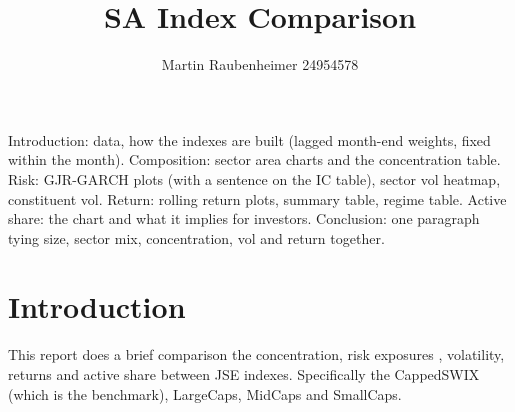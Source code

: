 \documentclass[11pt,preprint]{elsarticle}
\numberwithin{equation}{section}
\numberwithin{figure}{section}
\numberwithin{table}{section}
\begin{document}
\begin{frontmatter}  %

\title{SA Index Comparison}





\author[Add1]{Martin Raubenheimer 24954578}





\address[Add1]{Department of Economics, Stellenbosch University, South
Africa}



\vspace{1cm}





\vspace{0.5cm}

\end{frontmatter}

\setcounter{footnote}{0}



\pagestyle{fancy}
\chead{}
\rhead{}
\lfoot{}
\lhead{}
\cfoot{}


\headsep 35pt %




Introduction: data, how the indexes are built (lagged month-end weights,
fixed within the month). Composition: sector area charts and the
concentration table. Risk: GJR-GARCH plots (with a sentence on the IC
table), sector vol heatmap, constituent vol. Return: rolling return
plots, summary table, regime table. Active share: the chart and what it
implies for investors. Conclusion: one paragraph tying size, sector mix,
concentration, vol and return together.

\section{\texorpdfstring{Introduction
\label{Introduction}}{Introduction }}\label{introduction}

This report does a brief comparison the concentration, risk exposures ,
volatility, returns and active share between JSE indexes. Specifically
the CappedSWIX (which is the benchmark), LargeCaps, MidCaps and
SmallCaps.
\end{document}
